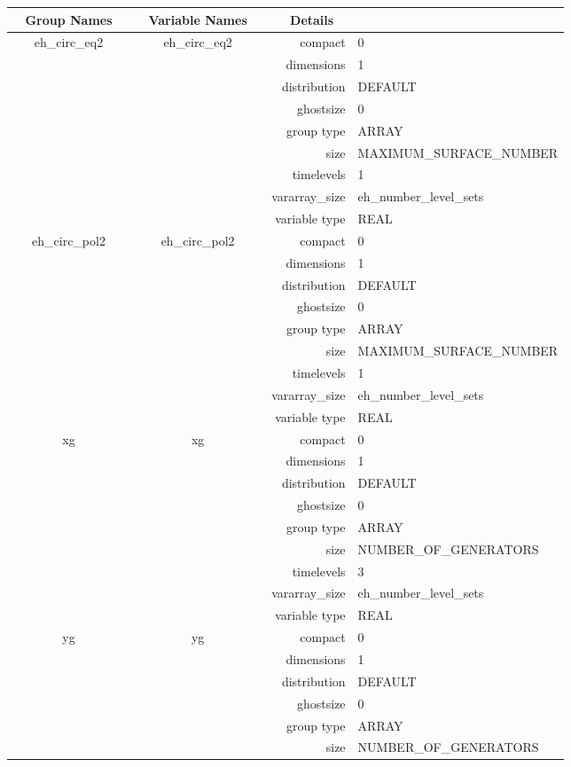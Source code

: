 \begin{tabular*}{150mm}{|c|c@{\extracolsep{\fill}}|rl|} \hline 
~ {\bf Group Names} ~ & ~ {\bf Variable Names} ~  &{\bf Details} ~ & ~ \\ 
\hline 
eh\_circ\_eq2 & eh\_circ\_eq2 & compact & 0 \\ 
 &  & dimensions & 1 \\ 
 &  & distribution & DEFAULT \\ 
 &  & ghostsize & 0 \\ 
 &  & group type & ARRAY \\ 
 &  & size & MAXIMUM\_SURFACE\_NUMBER \\ 
 &  & timelevels & 1 \\ 
 &  & vararray\_size & eh\_number\_level\_sets \\ 
 &  & variable type & REAL \\ 
\hline 
eh\_circ\_pol2 & eh\_circ\_pol2 & compact & 0 \\ 
 &  & dimensions & 1 \\ 
 &  & distribution & DEFAULT \\ 
 &  & ghostsize & 0 \\ 
 &  & group type & ARRAY \\ 
 &  & size & MAXIMUM\_SURFACE\_NUMBER \\ 
 &  & timelevels & 1 \\ 
 &  & vararray\_size & eh\_number\_level\_sets \\ 
 &  & variable type & REAL \\ 
\hline 
xg & xg & compact & 0 \\ 
 &  & dimensions & 1 \\ 
 &  & distribution & DEFAULT \\ 
 &  & ghostsize & 0 \\ 
 &  & group type & ARRAY \\ 
 &  & size & NUMBER\_OF\_GENERATORS \\ 
 &  & timelevels & 3 \\ 
 &  & vararray\_size & eh\_number\_level\_sets \\ 
 &  & variable type & REAL \\ 
\hline 
yg & yg & compact & 0 \\ 
 &  & dimensions & 1 \\ 
 &  & distribution & DEFAULT \\ 
 &  & ghostsize & 0 \\ 
 &  & group type & ARRAY \\ 
 &  & size & NUMBER\_OF\_GENERATORS \\ 

\end{tabular*}
